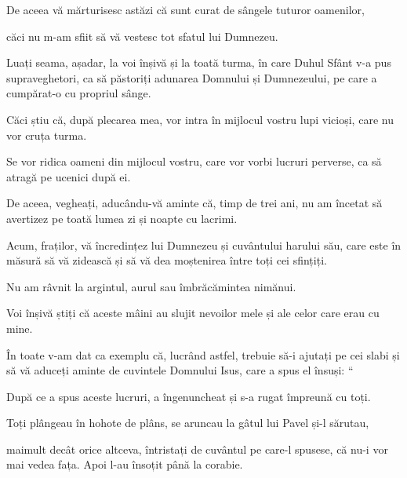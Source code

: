 {De aceea vă mărturisesc astăzi că sunt curat de sângele tuturor oamenilor,

căci nu m-am sfiit să vă vestesc tot sfatul lui Dumnezeu.

Luați seama, așadar, la voi înșivă și la toată turma, în care Duhul Sfânt v-a pus supraveghetori, ca să păstoriți adunarea Domnului și Dumnezeului, pe care a cumpărat-o cu propriul sânge.

Căci știu că, după plecarea mea, vor intra în mijlocul vostru lupi vicioși, care nu vor cruța turma.

Se vor ridica oameni din mijlocul vostru, care vor vorbi lucruri perverse, ca să atragă pe ucenici după ei.

De aceea, vegheați, aducându-vă aminte că, timp de trei ani, nu am încetat să avertizez pe toată lumea zi și noapte cu lacrimi.

Acum, fraților, vă încredințez lui Dumnezeu și cuvântului harului său, care este în măsură să vă zidească și să vă dea moștenirea între toți cei sfințiți.

Nu am râvnit la argintul, aurul sau îmbrăcămintea nimănui.

Voi înșivă știți că aceste mâini au slujit nevoilor mele și ale celor care erau cu mine.

În toate v-am dat ca exemplu că, lucrând astfel, trebuie să-i ajutați pe cei slabi și să vă aduceți aminte de cuvintele Domnului Isus, care a spus el însuși: “{}


\par }{\PP {}După ce a spus aceste lucruri, a îngenuncheat și s-a rugat împreună cu toți.

Toți plângeau în hohote de plâns, se aruncau la gâtul lui Pavel și-l sărutau,

maimult decât orice altceva, întristați de cuvântul pe care-l spusese, că nu-i vor mai vedea fața. Apoi l-au însoțit până la corabie.



\par }
